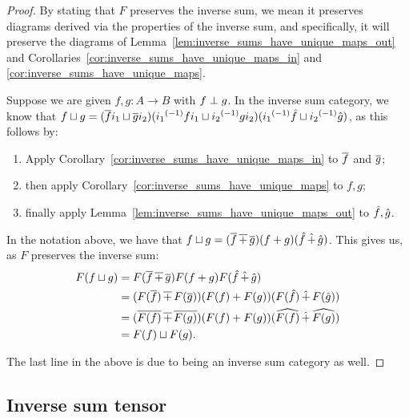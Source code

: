 \begin{proof}
  By stating that $F$ preserves the inverse sum, we mean it preserves diagrams derived via the
  properties of the inverse sum, and specifically, it will preserve the diagrams of
  Lemma~\ref{lem:inverse_sums_have_unique_maps_out} and
  Corollaries~\ref{cor:inverse_sums_have_unique_maps_in} and
  \ref{cor:inverse_sums_have_unique_maps}.

  Suppose we are given $f, g: A \to B$ with $f \perp g$. In the inverse sum category, we know that
  $f \sqcup g = (\overline{f}i_1 \sqcup \overline{g} i_2) ({i_1}^{(-1)} f i_1 \sqcup {i_2}^{(-1)} g i_2)
  ({i_1}^{(-1)} \hat{f} \sqcup {i_2}^{(-1)} \hat{g})$, as this follows by:
  \begin{enumerate}
    \item Apply Corollary~\ref{cor:inverse_sums_have_unique_maps_in} to $\overline{f}$ and $\overline{g}$;
    \item then apply Corollary~\ref{cor:inverse_sums_have_unique_maps} to $f, g$;
    \item finally apply Lemma~\ref{lem:inverse_sums_have_unique_maps_out} to $\hat{f}, \hat{g}$.
  \end{enumerate}

  In the notation above, we have that $f\sqcup g =
  (\overline{f} \operatorname{\overline{+}} \overline{g})({{f}+{g}})(\hat{f} \operatorname{\hat{+}} \hat{g})$. This gives us, as $F$ preserves
  the inverse sum:
  \begin{align*}
    F(f\sqcup g) &= F(\overline{f}\operatorname{\overline{+}} \overline{g})F({{f}+{g}})F(\hat{f} \operatorname{\hat{+}} \hat{g})\\
    &=(F(\overline{f})\operatorname{\overline{+}} F(\overline{g}))({{F(f)}+{F(g)}})(F(\hat{f}) \operatorname{\hat{+}} F(\hat{g}))\\
    &=(\overline{F(f)}\operatorname{\overline{+}} \overline{F(g)})({{F(f)}+{F(g)}})(\widehat{F(f)} \operatorname{\hat{+}} \widehat{F(g)})\\
    &=F(f) \sqcup F(g).
  \end{align*}

  The last line in the above is due to \Y being an inverse sum category as well.

\end{proof}



\subsection{Inverse sum tensor} %

